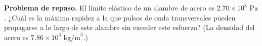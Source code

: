 \item \textbf{Problema de repaso.}
El límite elástico de un alambre de acero es $2.70 \times 10^8\text{ Pa}$. ¿Cuál es la máxima rapidez a la que pulsos de onda transversales pueden propagarse a lo largo de este alambre sin exceder este esfuerzo? (La densidad del acero es $7.86 \times 10^3\text{ kg/m}^3$.)